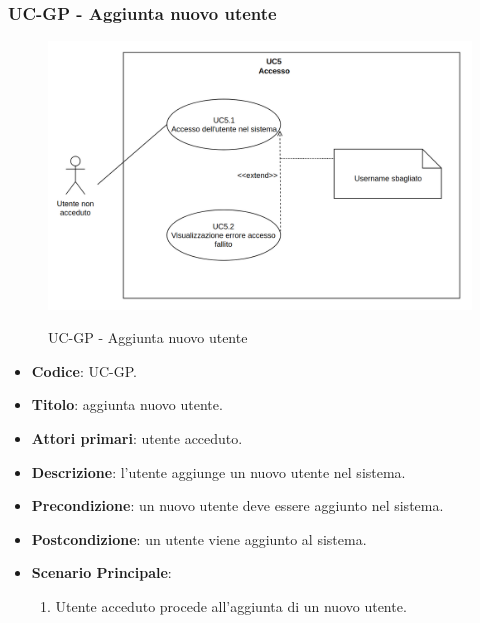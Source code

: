 \subsubsection{UC\theuccount-GP - Aggiunta nuovo utente}
		\begin{figure}[H]
			\centering
				\includegraphics[width=\columnwidth]{img/UC5.png}\\
			\caption{UC\theuccount-GP - Aggiunta nuovo utente}
		\end{figure}
	\begin{itemize}
		\item \textbf{Codice}: UC\theuccount-GP.
		\item \textbf{Titolo}: aggiunta nuovo utente.
		\item \textbf{Attori primari}: utente acceduto.
		\item \textbf{Descrizione}: l'utente aggiunge un nuovo utente nel sistema.
		\item \textbf{Precondizione}: un nuovo utente deve essere aggiunto nel sistema.
		\item \textbf{Postcondizione}: un utente viene aggiunto al sistema.
		\item \textbf{Scenario Principale}:
		\begin{enumerate}
			\item Utente acceduto procede all'aggiunta di un nuovo utente.
		\end{enumerate}
	\end{itemize}

